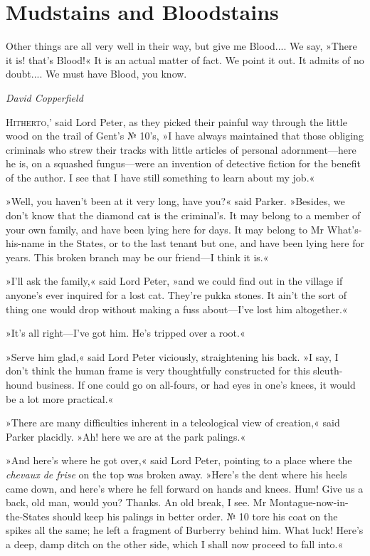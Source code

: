 \chapter{Mudstains and Bloodstains}

\epigraph{Other things are all very well in their way, but give me Blood.... We say, »There it is! that's Blood!« It is an actual matter of fact. We point it out. It admits of no doubt.... We must have Blood, you know.}{\textit{David Copperfield}}

\lettrine[lines=4,ante=`]{H}{itherto,}' said Lord Peter, as they picked their painful way through the little wood on the trail of Gent's № 10's, »I have always maintained that those obliging criminals who strew their tracks with little articles of personal adornment—here he is, on a squashed fungus—were an invention of detective fiction for the benefit of the author. I see that I have still something to learn about my job.«

»Well, you haven't been at it very long, have you?« said Parker.  »Besides, we don't know that the diamond cat is the criminal's. It may belong to a member of your own family, and have been lying here for days. It may belong to Mr What's-his-name in the States, or to the last tenant but one, and have been lying here for years. This broken branch may be our friend—I think it is.«

»I'll ask the family,« said Lord Peter, »and we could find out in the village if anyone's ever inquired for a lost cat. They're pukka stones. It ain't the sort of thing one would drop without making a fuss about—I've lost him altogether.«

»It's all right—I've got him. He's tripped over a root.«

»Serve him glad,« said Lord Peter viciously, straightening his back.  »I say, I don't think the human frame is very thoughtfully constructed for this sleuth-hound business. If one could go on all-fours, or had eyes in one's knees, it would be a lot more practical.«

»There are many difficulties inherent in a teleological view of creation,« said Parker placidly. »Ah! here we are at the park palings.«

»And here's where he got over,« said Lord Peter, pointing to a place where the \textit{chevaux de frise} on the top was broken away. »Here's the dent where his heels came down, and here's where he fell forward on hands and knees. Hum! Give us a back, old man, would you? Thanks.  An old break, I see. Mr Montague-now-in-the-States should keep his palings in better order. № 10 tore his coat on the spikes all the same; he left a fragment of Burberry behind him. What luck! Here's a deep, damp ditch on the other side, which I shall now proceed to fall into.«


